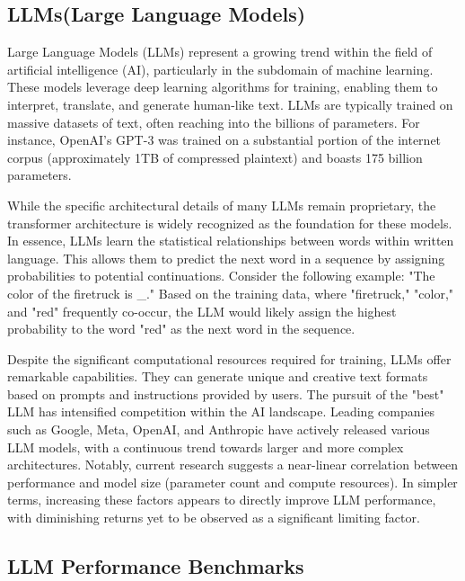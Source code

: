 \documentclass[12pt,a4paper]{report}
\begin{document}
\subsection{LLMs(Large Language Models)}

Large Language Models (LLMs) represent a growing trend within the field of artificial intelligence (AI), particularly in the subdomain of machine learning. These models leverage deep learning algorithms for training, enabling them to interpret, translate, and generate human-like text. LLMs are typically trained on massive datasets of text, often reaching into the billions of parameters. For instance, OpenAI's GPT-3 was trained on a substantial portion of the internet corpus (approximately 1TB of compressed plaintext) and boasts 175 billion parameters\citep{brown2020language}.

While the specific architectural details of many LLMs remain proprietary, the transformer architecture is widely recognized as the foundation for these models\citep{vaswani2023attention}. In essence, LLMs learn the statistical relationships between words within written language. This allows them to predict the next word in a sequence by assigning probabilities to potential continuations.
Consider the following example: "The color of the firetruck is \_." Based on the training data, where "firetruck," "color," and "red" frequently co-occur, the LLM would likely assign the highest probability to the word "red" as the next word in the sequence.

Despite the significant computational resources required for training, LLMs offer remarkable capabilities. They can generate unique and creative text formats based on prompts and instructions provided by users.
The pursuit of the "best" LLM has intensified competition within the AI landscape. Leading companies such as Google, Meta, OpenAI, and Anthropic have actively released various LLM models, with a continuous trend towards larger and more complex architectures. Notably, current research suggests a near-linear correlation between performance and model size (parameter count and compute resources)\citep{aghajanyan2023scaling}. In simpler terms, increasing these factors appears to directly improve LLM performance, with diminishing returns yet to be observed as a significant limiting factor.

\subsection{LLM Performance Benchmarks}
\end{document}
